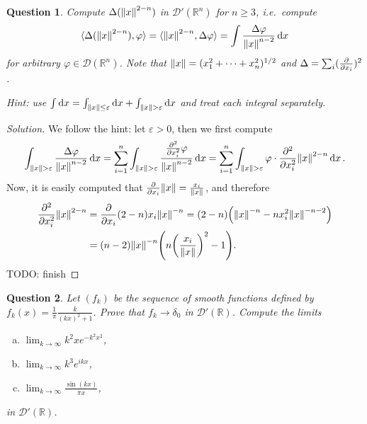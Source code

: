 \documentclass{article}
\theoremstyle{plain}
\newtheorem{question}{Question}
\theoremstyle{remark}
\newenvironment{solution}{\begin{proof}[Solution]\renewcommand\qedsymbol{}}{\end{proof}}
\renewcommand{\epsilon}{\varepsilon}
\renewcommand{\phi}{\varphi}
\newcommand{\Bb}{\mathbb}
\newcommand{\Cal}{\mathcal}
\newcommand{\RR}{\Bb R}
\newcommand{\DD}{\Cal D}
\DeclarePairedDelimiter{\ang}{\langle}{\rangle}
\newcommand\eps\epsilon
\newcommand\TODO{{\color{red} TODO: }}
\begin{document}
\begin{question}
	Compute $\Delta(\norm{x}^{2-n})$ in $\DD'(\RR^n)$ for $n \geq 3$, i.e.\ compute
	\[
	\ang{\Delta (\norm{x}^{2-n}), \phi} = \ang{\norm{x}^{2-n}, \Delta\phi} = \int \frac{\Delta\phi}{\norm{x}^{n-2}} \dd{x}
	\]
	for arbitrary $\phi \in \DD(\RR^n)$. Note that $\norm{x} = (x_1^2 +\dotsb +x_n^2)^{1/2}$ and $\Delta = \sum_i (\pdv{x_i})^2$. 
	
	\emph{Hint:} use $\int\dd{x} = \int_{\norm{x}\leq\eps}\dd{x} + \int_{\norm{x}>\eps}\dd{x}$ and treat each integral separately. 
\end{question}

\begin{solution}
	We follow the hint: let $\eps > 0$, then we first compute
	\[
	\int_{\norm{x} > \eps} \frac{\Delta\phi}{\norm{x}^{n-2}} \dd{x} = \sum_{i=1}^n \int_{\norm{x} > \eps} \frac{\pdv[2]{x_i} \phi}{\norm{x}^{n-2}}\dd{x} = \sum_{i=1}^n \int_{\norm{x} > \eps} \phi \cdot \pdv[2]{x_i} \norm{x}^{2-n} \dd{x}. 
	\]
	Now, it is easily computed that $\pdv{x_i} \norm{x} = \frac{x_i}{\norm{x}}$, and therefore 
	\begin{align*}
	\pdv[2]{x_i} \norm{x}^{2-n} &= \pdv{x_i} (2-n) x_i \norm{x}^{-n} = (2-n) \qty(\norm{x}^{-n} - n x_i^2 \norm{x}^{-n-2}) \\
	&= (n-2)\norm{x}^{-n} \qty(n \qty(\frac{x_i}{\norm{x}})^2 - 1). 
	\end{align*}
\TODO finish
\end{solution}

\begin{question}
	Let $(f_k)$ be the sequence of smooth functions defined by $f_k(x) = \frac1\pi \frac k{(kx)^2 + 1}$. Prove that $f_k \to \delta_0$ in $\DD'(\RR)$. Compute the limits
	\begin{enumerate}[(a)]
		\item $\lim_{k\to\infty} k^2 x e^{-k^2 x^2}$,
		\item $\lim_{k\to\infty} k^3 e^{ikx}$,
		\item $\lim_{k\to\infty} \frac{\sin(kx)}{\pi x}$,
	\end{enumerate}
in $\DD'(\RR)$. 
\end{question}
\end{document}
